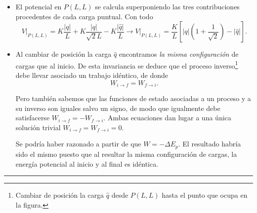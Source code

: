 \documentclass[a4paper,14pt]{exam}
\newcommand{\halmos}{
					\begin{flushright}
						\rule{1mm}{2.5mm} 
					\end{flushright}
					  }
\renewcommand{\qed}{\halmos}
\begin{document}
\begin{questions}
\begin{minipage}{.61\linewidth}
\end{minipage}\hfill
\begin{minipage}{.4\linewidth}

	\hspace*{.5cm}\def\svgwidth{0.9\linewidth}
	
\end{minipage}
\begin{mdframed}[backgroundcolor=yellow!20] 
\begin{itemize}
	\item[a)] El potencial en $P(L,L)$ se calcula superponiendo las tres contribuciones procedentes de cada carga puntual. Con todo
			\[V\bigg|_{P(L,L)}=K\frac{|q|}{L}+K\frac{|q|}{\sqrt{2}L}-K\frac{|\hat{q}|}{L}\rightarrow \boxed{V\bigg|_{P(L,L)}=\frac{K}{L}\left[|q|\left(1+\frac{1}{\sqrt{2}}\right)-|\hat{q}|\right].}\]
			
	\item[b)] Al cambiar de posición la carga $\hat{q}$ encontramos \textit{la misma configuración} de cargas que al inicio. De esta invariancia se deduce que el proceso inverso\footnote{Cambiar de posición la carga $\hat{q}$ desde $P(L,L)$ hasta el punto que ocupa en la figura.} debe llevar asociado un trabajo idéntico, de donde
	$$W_{i\to f}=W_{f\to i}.$$
	
	Pero también sabemos que las funciones de estado asociadas a un proceso y a su inverso son iguales salvo un signo, de modo que igualmente debe satisfacerse $W_{i\to f}=-W_{f\to i}$. Ambas ecuaciones dan lugar a una única solución trivial $\boxed{W_{i\to f}=W_{f\to i}=0.}$
	
	Se podría haber razonado a partir de que $W=-\Delta E_p$. El resultado habría sido el mismo puesto que al resultar la misma configuración de cargas, la energía potencial al inicio y al final es idéntica.
\end{itemize} 
			
			\end{mdframed}

	\qed


\newpage


 \end{questions}
\end{document}
